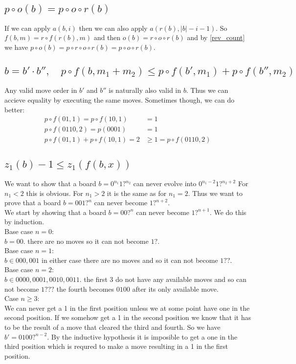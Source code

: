 \documentclass{article}
\begin{document}
\subsection{$p\circ o(b) = p\circ o\circ r(b)$}
If we can apply $a(b,i)$ then we can also apply $a(r(b),|b|-i-1)$. 
So $f(b,m) = r\circ f(r(b),m)$ and then $o(b)=r\circ o\circ r(b)$ and by \ref{rev_count} we have $p\circ o(b) = p\circ r\circ o\circ r(b)=p\circ o\circ r(b)$.

\subsection{$b = b'\cdot b'',\quad p\circ f(b,m_1+m_2) \le p\circ f(b',m_1) + p\circ f(b'',m_2)$ }
Any valid move order in $b'$ and $b''$ is naturally also valid in $b$. 
Thus we can accieve equality by executing the same moves. 
Sometimes though, we can do better: 
\begin{equation*}
\begin{split}
    p\circ f (01,1) = p\circ f (10,1) &= 1 \\
    p\circ f (0110,2) = p(0001) &= 1 \\
    p\circ f (01,1) + p\circ f (10,1) = 2 &\ge 1 = p\circ f (0110,2) 
\end{split}
\end{equation*}

\subsection{$z_1(b)-1\le z_1(f(b,x))$}
We want to show that a board $b = 0^{n_1}1?^{n_2}$ can never evolve into $0^{n_1-2}1?^{n_2+2}$
For $n_1<2$ this is obvious. 
For $n_1>2$ it is the same as for $n_1=2$. 
Thus we want to prove that a board $b = 001?^{n}$ can never become $1?^{n+2}$. 
\\
We start by showing that a board $b = 00?^{n}$ can never become $1?^{n+1}$. 
We do this by induction. \\
Base case $n=0$:\\
$b = 00$. there are no moves so it can not become $1?$. \\
Base case $n=1$: \\
$b \in {000, 001}$ in either case there are no moves and so it can not become $1??$. \\
Base case $n=2$: \\
$b \in {0000, 0001, 0010, 0011}$. the first 3 do not have any available moves and so can not become $1???$ the fourth becomes $0100$ after its only available move. \\
Case $n\ge 3$: \\
We can never get a 1 in the first position unless we at some point have one in the second position.
If we somehow get a 1 in the second position we know that it has to be the result of a move that cleared the third and fourth. 
So we have $b' = 0100?^{n-2}$. By the inductive hypothesis it is imposible to get a one in the third position which is requred to make a move resulting in a 1 in the first position. 
\end{document}
